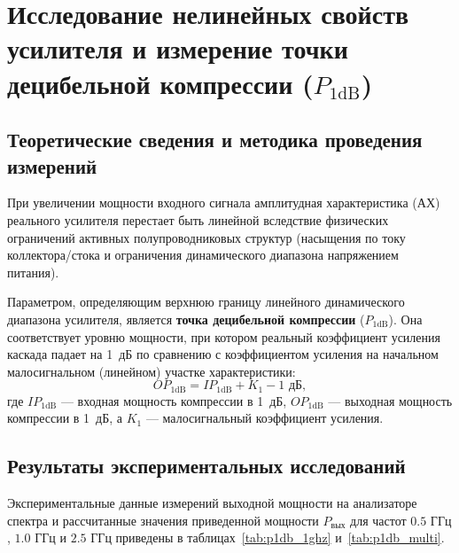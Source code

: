 \section{Исследование нелинейных свойств усилителя и измерение точки децибельной компрессии ($P_{1\text{dB}}$)}

\subsection{Теоретические сведения и методика проведения измерений}

При увеличении мощности входного сигнала амплитудная характеристика (АХ) реального усилителя перестает быть линейной вследствие физических ограничений активных полупроводниковых структур (насыщения по току коллектора/стока и ограничения динамического диапазона напряжением питания). 

Параметром, определяющим верхнюю границу линейного динамического диапазона усилителя, является \textbf{точка децибельной компрессии} ($P_{1\text{dB}}$). Она соответствует уровню мощности, при котором реальный коэффициент усиления каскада падает на 1~дБ по сравнению с коэффициентом усиления на начальном малосигнальном (линейном) участке характеристики:
\begin{equation}
OP_{1\text{dB}} = IP_{1\text{dB}} + K_1 - 1\text{ дБ},
\end{equation}
где $IP_{1\text{dB}}$ --- входная мощность компрессии в 1~дБ, $OP_{1\text{dB}}$ --- выходная мощность компрессии в 1~дБ, а $K_1$ --- малосигнальный коэффициент усиления.


\subsection{Результаты экспериментальных исследований}

Экспериментальные данные измерений выходной мощности на анализаторе спектра и рассчитанные значения приведенной мощности $P_{\text{вых}}$ для частот $0.5\text{ ГГц}$, $1.0\text{ ГГц}$ и $2.5\text{ ГГц}$ приведены в таблицах~\ref{tab:p1db_1ghz} и~\ref{tab:p1db_multi}.


